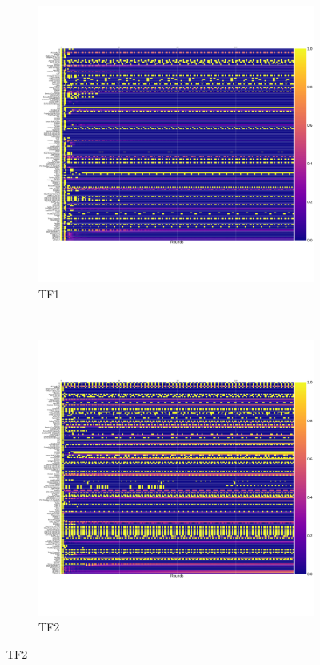 \documentclass{article}
\begin{document}
\begin{figure}[!hbtp]
    \centering
    \begin{subfigure}[t]{.5\textwidth}
        \centering
        \includegraphics[width=\textwidth]{./img/cooperation_0_0_10000_TF1_array.pdf}
        \caption{TF1}
    \end{subfigure}%
    ~
    \begin{subfigure}[t]{.5\textwidth}
        \centering
        \includegraphics[width=\textwidth]{./img/cooperation_0_0_10000_TF2_array.pdf}
        \caption{TF2}
    \end{subfigure}


\end{figure}
\end{document}
